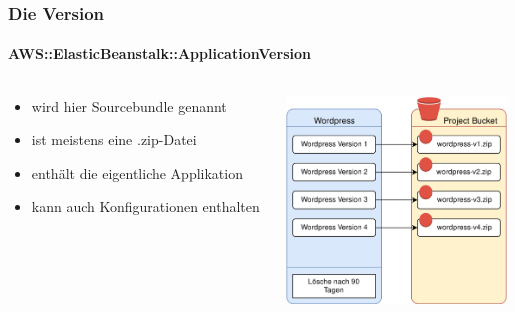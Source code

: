 \documentclass[aspectratio=169,grey,smaller]{beamer}
\begin{document}
\begin{frame}
  \frametitle{Die Version}
  \framesubtitle{AWS::ElasticBeanstalk::ApplicationVersion}
  \begin{columns}
  \begin{column}{.48\textwidth}
  \begin{itemize}
  \item<2-> wird hier Sourcebundle genannt
  \item<3-> ist meistens eine .zip-Datei
  \item<4-> enthält die eigentliche Applikation 
  \item<6-> kann auch Konfigurationen enthalten
  \end{itemize}
  \end{column}
  \begin{column}{.48\textwidth}
  \begin{flushright}
  \includegraphics[height=5.5cm]{applicationversion}
  \end{flushright}
  \end{column}
  \end{columns}
\end{frame}
\end{document}
